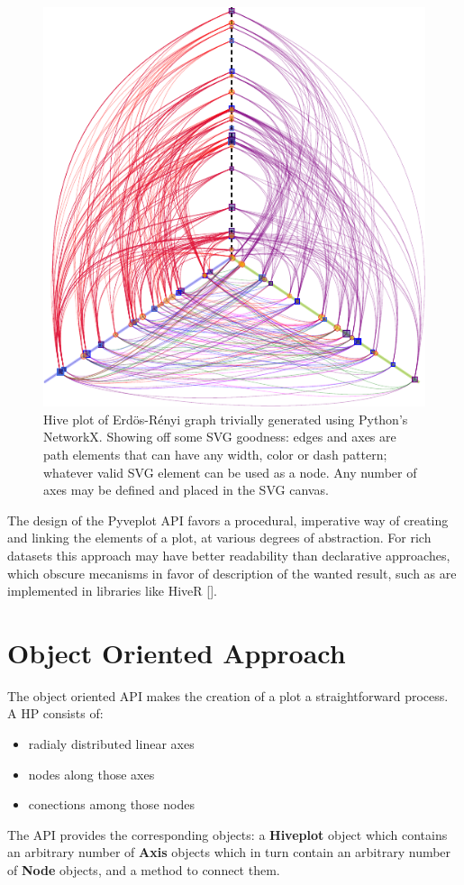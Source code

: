 \documentclass{bioinfo}
\begin{document}
\begin{figure}[th!]
  \centerline{\includegraphics[scale=0.8]{example.pdf}}
  \caption{Hive plot of Erd\"os-R\'enyi graph trivially generated
    using Python's NetworkX. Showing off some SVG goodness: edges and
    axes are path elements that can have any width, color or dash
    pattern; whatever valid SVG element can be used as a node. Any
    number of axes may be defined and placed in the SVG canvas.}
  \label{fig:01}
\end{figure}

The design of the Pyveplot API favors a procedural, imperative way of
creating and linking the elements of a plot, at various degrees of
abstraction. For rich datasets this approach may have better
readability than declarative approaches, which obscure mecanisms in
favor of description of the wanted result, such as are implemented in
libraries like HiveR [\cite{hiveR}].

\section{Object Oriented Approach}



The object oriented API makes the creation of a plot a straightforward
process. A HP consists of:
\begin{itemize}
\item radialy distributed linear axes
\item nodes along those axes
\item conections among those nodes
\end{itemize}
The API provides the corresponding objects: a {\bfseries Hiveplot} object
which contains an arbitrary number of {\bfseries Axis} objects which in
turn contain an arbitrary number of {\bfseries Node} objects, and a method
to connect them.
\end{document}
